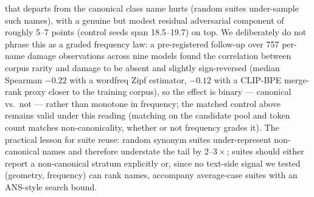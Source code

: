\documentclass[11pt]{article}
\begin{document}
that departs from the canonical class name hurts (random suites
under-sample such names), with a genuine but modest residual adversarial
component of roughly 5--7 points (control seeds span 18.5--19.7) on top.
We deliberately do not phrase this as a graded frequency law: a
pre-registered follow-up over 757 per-name damage observations across nine
models found the correlation between corpus rarity and damage to be absent
and slightly sign-reversed (median Spearman $-0.22$ with a wordfreq Zipf
estimator, $-0.12$ with a CLIP-BPE merge-rank proxy closer to the training
corpus), so the effect is binary --- canonical vs.\ not --- rather than
monotone in frequency; the matched control above remains valid under this
reading (matching on the candidate pool and token count matches
non-canonicality, whether or not frequency grades it). The practical
lesson for suite reuse: random synonym suites under-represent
non-canonical names and therefore understate the tail by $2$--$3\times$;
suites should either report a non-canonical stratum explicitly or, since
no text-side signal we tested (geometry, frequency) can rank names,
accompany average-case suites with an ANS-style search bound.
\end{document}
